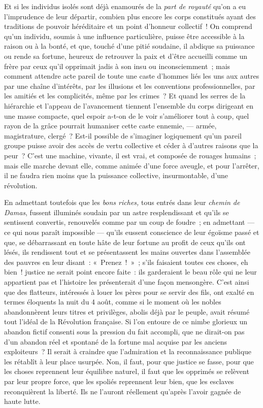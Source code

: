\documentclass[french,twoside]{book} %
\begin{document}
Et si les individus isolés sont déjà enamourés de la \emph{part de royauté} qu’on a eu l’imprudence de leur départir, combien plus encore les corps constitués ayant des traditions de pouvoir héréditaire et un point d’honneur collectif ! On comprend qu’un individu, soumis à une influence particulière, puisse être accessible à la raison ou à la bonté, et que, touché d’une pitié soudaine, il abdique sa puissance ou rende sa fortune, heureux de retrouver la paix et d’être accueilli comme un frère par  ceux qu’il opprimait jadis à son insu ou inconsciemment ; mais comment attendre acte pareil de toute une caste d’hommes liés les uns aux autres par une chaîne d’intérêts, par les illusions et les conventions professionnelles, par les amitiés et les complicités, même par les crimes ? Et quand les serres de la hiérarchie et l’appeau de l’avancement tiennent l’ensemble du corps dirigeant en une masse compacte, quel espoir a-t-on de le voir s’améliorer tout à coup, quel rayon de la grâce pourrait humaniser cette caste ennemie, — armée, magistrature, clergé ? Est-il possible de s’imaginer logiquement qu’un pareil groupe puisse avoir des accès de vertu collective et céder à d’autres raisons que la peur ? C’est une machine, vivante,  il est vrai, et composée de rouages humains ; mais elle marche devant elle, comme animée d’une force aveugle, et pour l’arrêter, il ne faudra rien moins que la puissance collective, insurmontable, d’une révolution.\par
En admettant toutefois que les \emph{bons riches,} tous entrés dans leur \emph{chemin de Damas}, fussent illuminés soudain par un astre resplendissant et qu’ils se sentissent convertis, renouvelés comme par un coup de foudre ; en admettant — ce qui nous paraît impossible — qu’ils eussent conscience de leur égoïsme passé et que, se débarrassant en toute hâte de leur fortune au profit de ceux qu’ils ont lésés, ils rendissent tout et se présentassent les mains ouvertes dans l’assemblée des pauvres en leur disant :  « Prenez ! » ; s’ils faisaient toutes ces choses, eh bien ! justice ne serait point encore faite : ils garderaient le beau rôle qui ne leur appartient pas et l’histoire les présenterait d’une façon mensongère. C’est ainsi que des flatteurs, intéressés à louer les pères pour se servir des fils, ont exalté en termes éloquents la nuit du 4 août, comme si le moment où les nobles abandonnèrent leurs titres et privilèges, abolis déjà par le peuple, avait résumé tout l’idéal de la Révolution française. Si l’on entoure de ce nimbe glorieux un abandon fictif consenti sous la pression du fait accompli, que ne dirait-on pas d’un abandon réel et spontané de la fortune mal acquise par les anciens exploiteurs ? Il serait à craindre que l’admiration et la  reconnaissance publique les rétablît à leur place usurpée. Non, il faut, pour que justice se fasse, pour que les choses reprennent leur équilibre naturel, il faut que les opprimés se relèvent par leur propre force, que les spoliés reprennent leur bien, que les esclaves reconquièrent la liberté. Ils ne l’auront réellement qu’après l’avoir gagnée de haute lutte.\par
\end{document}
